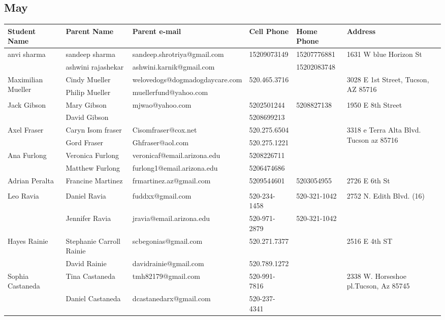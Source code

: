 \documentclass[landscape]{article}\usepackage[]{graphicx}\usepackage[]{color}
\begin{document}
\subsection{May}
\begin{longtable}{p{70pt}|p{75pt}|p{120pt}|p{60pt}|p{60pt}|p{120pt}|}
Student Name & Parent Name & Parent e-mail & Cell Phone & Home Phone & Address\\
\hline
\multirow{2}{70pt}{anvi sharma} & sandeep sharma & sandeep.shrotriya@gmail.com & 15209073149 & 15207776881 & \multirow{2}{100pt}{1631 W blue Horizon St} \\
 & ashwini rajashekar & ashwini.karnik@gmail.com &  & 15202083748 & \\
\hline
\multirow{2}{70pt}{Maximilian Mueller} & Cindy Mueller & welovedogs@dogmadogdaycare.com & 520.465.3716 &  & \multirow{2}{100pt}{3028 E 1st Street, Tucson, AZ 85716} \\
 & Philip Mueller & muellerfund@yahoo.com &  &  & \\
\hline
\multirow{2}{70pt}{Jack Gibson} & Mary Gibson & mjwao@yahoo.com & 5202501244 & 5208827138 & \multirow{2}{100pt}{1950 E 8th Street} \\
 & David Gibson &  & 5208699213 &  & \\
\hline
\multirow{2}{70pt}{Axel Fraser } & Caryn Isom fraser & Cisomfraser@cox.net & 520.275.6504 &  & \multirow{2}{100pt}{3318 e Terra Alta Blvd. Tucson az 85716 } \\
 & Gord Fraser  & Ghfraser@aol.com & 520.275.1221 &  & \\
\hline
\multirow{2}{70pt}{Ana Furlong} & Veronica Furlong & veronicaf@email.arizona.edu & 5208226711 &  & \multirow{2}{100pt}{} \\
 & Matthew Furlong & furlong1@email.arizona.edu & 5206474686 &  & \\
\hline
\multirow{2}{70pt}{Adrian Peralta} & Francine Martinez & frmartinez.az@gmail.com & 5209544601 & 5203054955 & \multirow{2}{100pt}{2726 E 6th St} \\
 &  &  &  &  & \\
\hline
\multirow{2}{70pt}{Leo Ravia} & Daniel Ravia & fuddxx@gmail.com & 520-234-1458 & 520-321-1042 & \multirow{2}{100pt}{2752 N. Edith Blvd. (16)} \\
 & Jennifer Ravia & jravia@email.arizona.edu & 520-971-2879 & 520-321-1042 & \\
\hline
\multirow{2}{70pt}{Hayes Rainie} & Stephanie Carroll Rainie & scbegonias@gmail.com & 520.271.7377 &  & \multirow{2}{100pt}{2516 E 4th ST} \\
 & David Rainie & davidrainie@gmail.com & 520.789.1272 &  & \\
\hline
\multirow{2}{70pt}{Sophia Castaneda} & Tina Castaneda & tmh82179@gmail.com & 520-991-7816 &  & \multirow{2}{100pt}{2338 W. Horseshoe pl.Tucson, Az 85745} \\
 & Daniel Castaneda & dcastanedarx@gmail.com & 520-237-4341 &  & \\
\hline
\end{longtable}
\newpage
\end{document}
